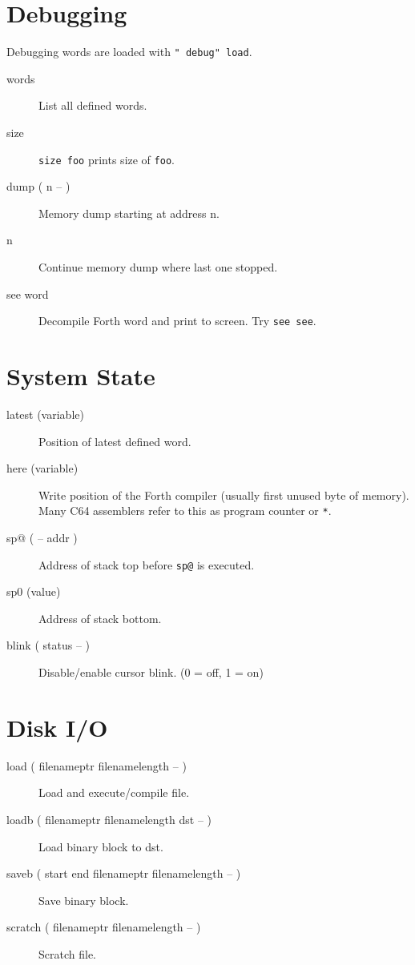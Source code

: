 \section{Debugging}

Debugging words are loaded with \texttt{" debug" load}.

\begin{description}
\item[words] List all defined words.
\item[size] \texttt{size foo} prints size of \texttt{foo}.
\item[dump ( n -- )] Memory dump starting at address n.
\item[n] Continue memory dump where last one stopped.
\item[see word] Decompile Forth word and print to screen. Try \texttt{see see}.
\end{description}


\section{System State}

\begin{description}

\item[latest (variable)] Position of latest defined word.

\item[here (variable)] Write position of the Forth compiler (usually first unused byte of memory). Many C64 assemblers refer to this as program counter or \texttt{*}.

\item[sp@ ( -- addr )] Address of stack top before \texttt{sp@} is executed.
\item[sp0 (value)] Address of stack bottom.
\item[blink ( status -- )] Disable/enable cursor blink. (0 = off, 1 = on)

\end{description}


\section{Disk I/O}

\begin{description}
\item[load ( filenameptr filenamelength -- )] Load and execute/compile file.
\item[loadb ( filenameptr filenamelength dst -- )] Load binary block to dst.
\item[saveb ( start end filenameptr filenamelength -- )] Save binary block.
\item[scratch ( filenameptr filenamelength -- )] Scratch file.
\end{description}


